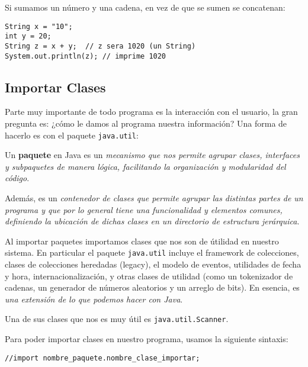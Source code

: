 \documentclass[12pt]{article}
\newcounter{it}
\theoremstyle{largebreak}
\begin{document}
    \begin{obs}
        Si sumamos un número y una cadena, en vez de que se sumen se concatenan:
        \begin{lstlisting}[caption={Suma de Número y \lstinline|String|.},label=DescriptiveLabel]
String x = "10";
int y = 20;
String z = x + y;  // z sera 1020 (un String)
System.out.println(z); // imprime 1020
        \end{lstlisting}
    \end{obs}

    \subsection{Importar Clases}

    Parte muy importante de todo programa es la interacción con el usuario, la gran pregunta es: ¿cómo le damos al programa nuestra información? Una forma de hacerlo es con el paquete \lstinline|java.util|:

    \begin{mydef}
        Un \textbf{paquete} en Java es un \textit{mecanismo que nos permite agrupar clases, interfaces y subpaquetes de manera lógica, facilitando la organización y modularidad del código}.

        Además, es un \textit{contenedor de clases que permite agrupar las distintas partes de un programa y que por lo general tiene una funcionalidad y elementos comunes, definiendo la ubicación de dichas clases en un directorio de estructura jerárquica}.
    \end{mydef}

    Al importar paquetes importamos clases que nos son de útilidad en nuestro sistema. En particular el paquete \lstinline|java.util| incluye el framework de colecciones, clases de colecciones heredadas (legacy), el modelo de eventos, utilidades de fecha y hora, internacionalización, y otras clases de utilidad (como un tokenizador de cadenas, un generador de números aleatorios y un arreglo de bits). En esencia, es \textit{una extensión de lo que podemos hacer con Java}.

    Una de sus clases que nos es muy útil es \lstinline|java.util.Scanner|.

    Para poder importar clases en nuestro programa, usamos la siguiente sintaxis:

    \begin{lstlisting}[caption={Importar Clases en Java.},label=DescriptiveLabel]
//import nombre_paquete.nombre_clase_importar;
    \end{lstlisting}
\end{document}
